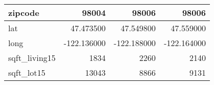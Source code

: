 \begin{table}[H]
\begin{tabular}{|l|r|r|r|}
\hline zipcode & \cellcolor[rgb]{0.9, 0.54, 0.52} 98004 & 98006 & 98006 \\
\hline lat & \cellcolor[rgb]{0.9, 0.54, 0.52} 47.473500 & 47.549800 & 47.559000 \\
\hline long & \cellcolor[rgb]{0.9, 0.54, 0.52} -122.136000 & \cellcolor[rgb]{0.9, 0.54, 0.52} -122.188000 & \cellcolor[rgb]{0.9, 0.54, 0.52} -122.164000 \\
\hline sqft\_living15 & \cellcolor[rgb]{0.9, 0.54, 0.52} 1834 & 2260 & 2140 \\
\hline sqft\_lot15 & \cellcolor[rgb]{0.9, 0.54, 0.52} 13043 & 8866 & 9131 \\
\hline
\end{tabular}
\end{table}
